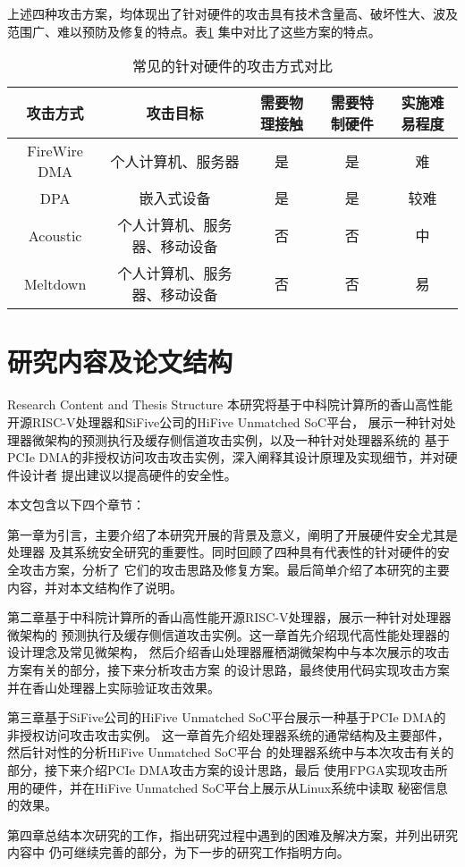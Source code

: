 上述四种攻击方案，均体现出了针对硬件的攻击具有技术含量高、破坏性大、波及范围广、难以预防及修复的特点。表\ref{tab:hw-attack-comp}
集中对比了这些方案的特点。

\begin{table}[!ht]
	\centering
\begin{threeparttable}[b]
\caption{常见的针对硬件的攻击方式对比}
\begin{tabular}{ccccc}
	\toprule
	攻击方式 & 攻击目标 & 需要物理接触 & 需要特制硬件 & 实施难易程度 \\
	\midrule
	FireWire DMA\cite{becher2005firewire} & 个人计算机、服务器 & 是 & 是 & 难 \\
	DPA\cite{kocher1999differential} & 嵌入式设备 & 是 & 是 & 较难 \\
	Acoustic\cite{acoustic} & 个人计算机、服务器、移动设备 & 否 & 否 & 中 \\
	Meltdown\cite{lipp_meltdown_2018} & 个人计算机、服务器、移动设备 & 否 & 否 & 易 \\
	\bottomrule
\end{tabular}
\label{tab:hw-attack-comp}
\end{threeparttable}
\end{table}


\section{研究内容及论文结构}{Research Content and Thesis Structure}
本研究将基于中科院计算所的香山高性能开源RISC-V处理器和SiFive公司的HiFive Unmatched SoC平台，
展示一种针对处理器微架构的预测执行及缓存侧信道攻击实例，以及一种针对处理器系统的
基于PCIe DMA的非授权访问攻击攻击实例，深入阐释其设计原理及实现细节，并对硬件设计者
提出建议以提高硬件的安全性。

本文包含以下四个章节：

第一章为引言，主要介绍了本研究开展的背景及意义，阐明了开展硬件安全尤其是处理器
及其系统安全研究的重要性。同时回顾了四种具有代表性的针对硬件的安全攻击方案，分析了
它们的攻击思路及修复方案。最后简单介绍了本研究的主要内容，并对本文结构作了说明。

第二章基于中科院计算所的香山高性能开源RISC-V处理器，展示一种针对处理器微架构的
预测执行及缓存侧信道攻击实例。这一章首先介绍现代高性能处理器的设计理念及常见微架构，
然后介绍香山处理器雁栖湖微架构中与本次展示的攻击方案有关的部分，接下来分析攻击方案
的设计思路，最终使用代码实现攻击方案并在香山处理器上实际验证攻击效果。

第三章基于SiFive公司的HiFive Unmatched SoC平台展示一种基于PCIe DMA的非授权访问攻击攻击实例。
这一章首先介绍处理器系统的通常结构及主要部件，然后针对性的分析HiFive Unmatched SoC平台
的处理器系统中与本次攻击有关的部分，接下来介绍PCIe DMA攻击方案的设计思路，最后
使用FPGA实现攻击所用的硬件，并在HiFive Unmatched SoC平台上展示从Linux系统中读取
秘密信息的效果。

第四章总结本次研究的工作，指出研究过程中遇到的困难及解决方案，并列出研究内容中
仍可继续完善的部分，为下一步的研究工作指明方向。

\newpage
